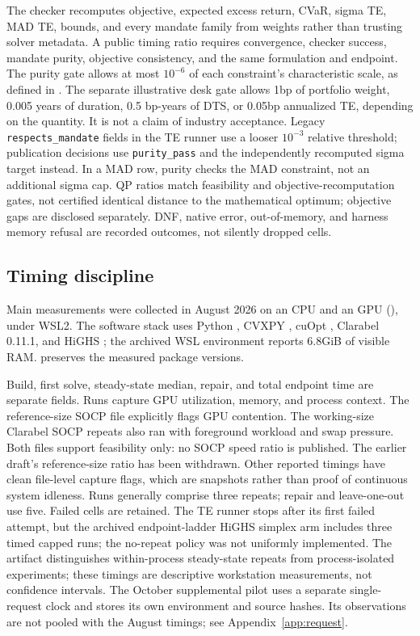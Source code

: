 \documentclass[11pt,a4paper]{article}
\begin{document}
The checker recomputes objective, expected excess return, CVaR, sigma TE, MAD
TE, bounds, and every mandate family from weights rather than trusting solver
metadata. A public timing ratio requires convergence, checker success, mandate
purity, objective consistency, and the same formulation and endpoint.
The purity gate allows at most $10^{-6}$ of each constraint's characteristic
scale, as defined in . The separate illustrative desk gate
allows 1bp of portfolio weight, 0.005 years of duration, 0.5 bp-years of DTS,
or 0.05bp annualized TE, depending on the quantity. It is not a claim of
industry acceptance. Legacy \texttt{respects\_mandate} fields in the TE
runner use a looser $10^{-3}$ relative threshold; publication decisions use
\texttt{purity\_pass} and the independently recomputed sigma target instead.
In a MAD row, purity checks the MAD constraint, not an additional sigma cap.
QP ratios match feasibility and objective-recomputation gates, not certified
identical distance to the mathematical optimum; objective gaps are disclosed
separately. DNF, native error, out-of-memory, and harness memory refusal are
recorded outcomes, not silently dropped cells.

\subsection{Timing discipline}

Main measurements were collected in August 2026 on an \EnvCpu{} CPU and an
\EnvGpu{} GPU (\EnvGpuMemory), under WSL2. The software stack uses Python
\EnvPython, CVXPY \EnvCvxpy, cuOpt \EnvCuopt, Clarabel 0.11.1, and HiGHS
\EnvHighs; the archived WSL environment reports 6.8GiB of visible RAM.
 preserves the measured package versions.

Build, first solve, steady-state median, repair, and total endpoint time are
separate fields. Runs capture GPU utilization, memory, and process context. The
reference-size SOCP file explicitly flags GPU contention. The working-size
Clarabel SOCP repeats also ran with foreground workload and swap pressure.
Both files support feasibility only: no SOCP speed ratio is published.
The earlier draft's reference-size ratio has been withdrawn. Other reported
timings have clean file-level capture flags, which are snapshots rather than
proof of continuous system idleness. Runs generally comprise three repeats;
repair and leave-one-out use five. Failed cells are retained. The TE runner
stops after its first failed attempt, but the archived endpoint-ladder HiGHS
simplex arm includes three timed capped runs; the no-repeat policy was not
uniformly implemented. The artifact distinguishes
within-process steady-state repeats from process-isolated experiments; these
timings are descriptive workstation measurements, not confidence intervals.
The October supplemental pilot uses a separate single-request clock and stores
its own environment and source hashes. Its observations are not pooled with
the August timings; see Appendix~\ref{app:request}.
\end{document}
